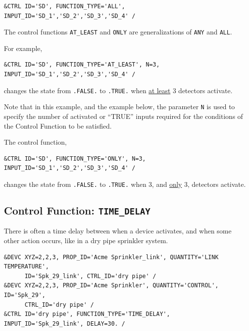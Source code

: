 \documentclass[11pt]{book}
\newcommand{\ct}{\tt\small}
\begin{document}
\footnotesize
\begin{verbatim}
&CTRL ID='SD', FUNCTION_TYPE='ALL', INPUT_ID='SD_1','SD_2','SD_3','SD_4' /
\end{verbatim}
\normalsize

\noindent

The control functions {\ct AT\_LEAST} and {\ct ONLY} are generalizations of {\ct ANY} and {\ct ALL}.

For example,

\footnotesize
\begin{verbatim}
&CTRL ID='SD', FUNCTION_TYPE='AT_LEAST', N=3, INPUT_ID='SD_1','SD_2','SD_3','SD_4' /
\end{verbatim}

\normalsize
\noindent
changes the state from {\ct .FALSE.} to {\ct .TRUE.} when \underline{at least}
3 detectors activate.

Note that in this example, and the example below, the parameter {\ct N} is used to
specify the number of activated or ``TRUE'' inputs required for the conditions
of the Control Function to be satisfied.

The control function,

\footnotesize
\begin{verbatim}
&CTRL ID='SD', FUNCTION_TYPE='ONLY', N=3, INPUT_ID='SD_1','SD_2','SD_3','SD_4' /
\end{verbatim}

\normalsize
\noindent
changes the state from {\ct .FALSE.} to {\ct .TRUE.} when 3,
and \underline{only} 3, detectors activate.


\subsection{Control Function: \texorpdfstring{{\tt TIME\_DELAY}}{TIME\_DELAY}}

There is often a time delay 
between when a device activates, and when some other action occurs, like in a dry pipe sprinkler system.

\footnotesize
\begin{verbatim}
&DEVC XYZ=2,2,3, PROP_ID='Acme Sprinkler_link', QUANTITY='LINK TEMPERATURE',
      ID='Spk_29_link', CTRL_ID='dry pipe' /
&DEVC XYZ=2,2,3, PROP_ID='Acme Sprinkler', QUANTITY='CONTROL', ID='Spk_29',
      CTRL_ID='dry pipe' /
&CTRL ID='dry pipe', FUNCTION_TYPE='TIME_DELAY', INPUT_ID='Spk_29_link', DELAY=30. /
\end{verbatim}
\normalsize
\end{document}
